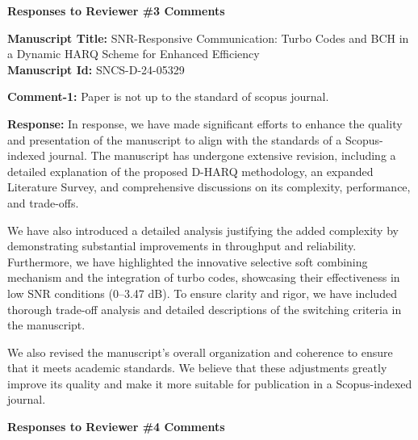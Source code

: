 \documentclass[a4paper,10pt]{article}
\begin{document}
\newpage


\noindent \textbf{Responses to  Reviewer \#3 Comments}

\vspace{0.25in}

\noindent \textbf{Manuscript Title:} SNR-Responsive Communication: Turbo Codes and BCH in a Dynamic HARQ Scheme for Enhanced Efficiency \\

\noindent \textbf{Manuscript Id:} SNCS-D-24-05329 \\

\begin{enumerate}

{\color{blue} \item \textbf{Comment-1:} Paper is not up to the standard of scopus journal.}

\textbf{Response:} In response, we have made significant efforts to enhance the quality and presentation of the manuscript to align with the standards of a Scopus-indexed journal. The manuscript has undergone extensive revision, including a detailed explanation of the proposed D-HARQ methodology, an expanded Literature Survey, and comprehensive discussions on its complexity, performance, and trade-offs.

We have also introduced a detailed analysis justifying the added complexity by demonstrating substantial improvements in throughput and reliability. Furthermore, we have highlighted the innovative selective soft combining mechanism and the integration of turbo codes, showcasing their effectiveness in low SNR conditions (0–3.47 dB). To ensure clarity and rigor, we have included thorough trade-off analysis and detailed descriptions of the switching criteria in the manuscript.

We also revised the manuscript's overall organization and coherence to ensure that it meets academic standards. We believe that these adjustments greatly improve its quality and make it more suitable for publication in a Scopus-indexed journal.

\end{enumerate}
\newpage


\noindent \textbf{Responses to  Reviewer \#4 Comments}

\vspace{0.25in}
\end{document}
